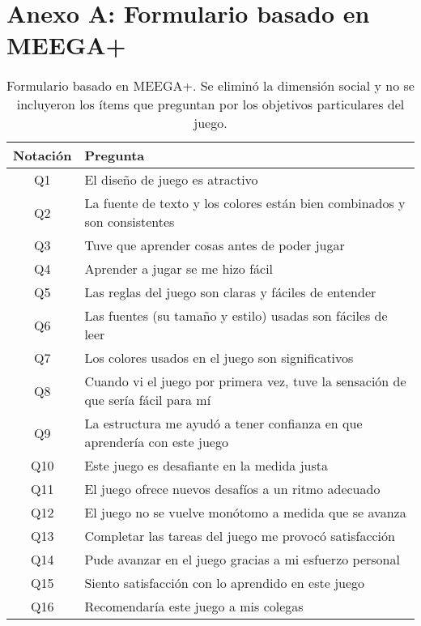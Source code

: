 \chapter{Anexo A: Formulario basado en MEEGA+} \label{AnexoA}


\begin{table}[h]
\centering
\caption{Formulario basado en MEEGA+. Se eliminó la dimensión social y no se incluyeron los ítems que preguntan por los objetivos particulares del juego.}
\label{TablaFormularioMEEGA}

\begin{tabular}{|c|l|} %
\hline %
\textbf{Notación} & \textbf{Pregunta} \\\hline %
Q1       & El diseño de juego es atractivo \\ 
Q2       & La fuente de texto y los colores están bien combinados y son consistentes \\
Q3       & Tuve que aprender cosas antes de poder jugar \\
Q4       & Aprender a jugar se me hizo fácil \\
Q5       & Las reglas del juego son claras y fáciles de entender \\
Q6       & Las fuentes (su tamaño y estilo) usadas son fáciles de leer \\
Q7       & Los colores usados en el juego son significativos \\
Q8       & Cuando vi el juego por primera vez, tuve la sensación de que sería fácil para mí \\
Q9       & La estructura me ayudó a tener confianza en que aprendería con este juego \\
Q10      & Este juego es desafiante en la medida justa \\
Q11      & El juego ofrece nuevos desafíos a un ritmo adecuado \\
Q12      & El juego no se vuelve monótomo a medida que se avanza \\
Q13      & Completar las tareas del juego me provocó satisfacción \\
Q14      & Pude avanzar en el juego gracias a mi esfuerzo personal \\
Q15      & Siento satisfacción con lo aprendido en este juego \\
Q16      & Recomendaría este juego a mis colegas \\

\end{tabular}
\end{table}
